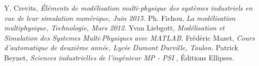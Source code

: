 \documentclass[10pt,fleqn]{article} %
\begin{document}
\begin{thebibliography}{2}
    Y. Crevits, {\it Éléments de modélisation multi-physique des systèmes industriels en vue de leur simulation numérique, Juin 2015.}
    Ph. Fichou, {\it La modélisation multiphysique, Technologie, Mars 2012.}
    Yvan Liebgott, {\it Modélisation et Simulation des Systemes Multi-Physiques avec MATLAB.}
    Frédéric Mazet, {\it Cours d'automatique de deuxième année, Lycée Dumont Durville, Toulon.}
    Patrick Beynet, {\it Sciences industrielles de l'ingénieur MP - PSI}
, Éditions Ellipses.

\end{thebibliography}
\end{document}
